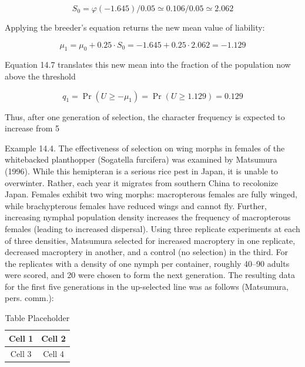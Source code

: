 \documentclass{article}
\begin{document}
\begin{equation}
S_{0}=\varphi(-1.645)/0.05\simeq0.106/0.05\simeq2.062
\end{equation}

Applying the breeder’s equation returns the new mean value of liability:

\begin{equation}
\mu_{1}=\mu_{0}+0.25\cdot S_{0}=-1.645+0.25\cdot2.062=-1.129
\end{equation}

Equation 14.7 translates this new mean into the fraction of the population now above the threshold

\begin{equation}
q_{1}=\Pr(U\geq-\mu_{1})=\Pr(U\geq1.129)=0.129
\end{equation}

Thus, after one generation of selection, the character frequency is expected to increase from 5%

Example 14.4. The effectiveness of selection on wing morphs in females of the whitebacked planthopper (Sogatella furcifera) was examined by Matsumura (1996). While this hemipteran is a serious rice pest in Japan, it is unable to overwinter. Rather, each year it migrates from southern China to recolonize Japan. Females exhibit two wing morphs: macropterous females are fully winged, while brachypterous females have reduced wings and cannot fly. Further, increasing nymphal population density increases the frequency of macropterous females (leading to increased dispersal). Using three replicate experiments at each of three densities, Matsumura selected for increased macroptery in one replicate, decreased macroptery in another, and a control (no selection) in the third. For the replicates with a density of one nymph per container, roughly 40–90 adults were scored, and 20 were chosen to form the next generation. The resulting data for the first five generations in the up-selected line was as follows (Matsumura, pers. comm.):

\begin{table}[h]
\centering
\begin{tabular}{|c|c|}
\hline
Cell 1 & Cell 2 \\
\hline
Cell 3 & Cell 4 \\
\hline
\end{tabular}
\caption{Table Placeholder}
\end{table}
\end{document}
